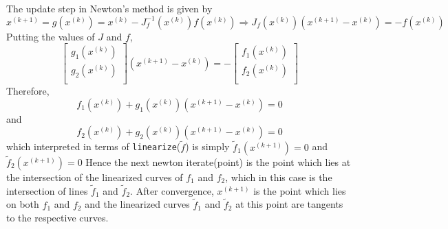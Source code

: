 \documentclass{article}
\begin{document}
\begin{enumerate}
    The update step in Newton's method is given by
    $$x^{(k + 1)} = g(x^{(k)}) = x^{(k)} - J_f^{-1}(x^{(k)})f(x^{(k)}) \Rightarrow J_f(x^{(k)})(x^{(k + 1)} - x^{(k)}) = -f(x^{(k)})$$
    Putting the values of $J$ and $f$,
    $$\begin{bmatrix}
        g_1(x^{(k)})\\
        g_2(x^{(k)})\\
    \end{bmatrix}(x^{(k + 1)} - x^{(k)}) = -\begin{bmatrix}
        f_1(x^{(k)})\\
        f_2(x^{(k)})\\
    \end{bmatrix}$$
    Therefore,
    $$f_1(x^{(k)}) + g_1(x^{(k)})(x^{(k + 1)} - x^{(k)}) = 0$$
    and
    $$f_2(x^{(k)}) + g_2(x^{(k)})(x^{(k + 1)} - x^{(k)}) = 0$$
    which interpreted in terms of \texttt{linearize}($\tilde{f}$) is simply $\tilde{f}_1(x^{(k + 1)}) = 0$ and $\tilde{f}_2(x^{(k + 1)}) = 0$
    Hence the next newton iterate(point) is the point which lies at the intersection of the linearized curves of $f_1$ and $f_2$, which in this case is the intersection of lines $\tilde{f}_1$ and $\tilde{f}_2$. After convergence, $x^{(k + 1)}$ is the point which lies on both $f_1$ and $f_2$ and the linearized curves $\tilde{f}_1$ and $\tilde{f}_2$ at this point are tangents to the respective curves.

    $\;$\\


\end{enumerate}
\end{document}
